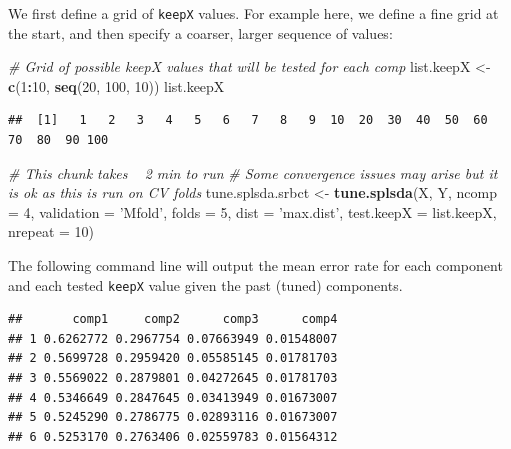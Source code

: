 \documentclass[]{book}
\newenvironment{Shaded}{\begin{snugshade}}{\end{snugshade}}
\newcommand{\KeywordTok}[1]{\textcolor[rgb]{0.13,0.29,0.53}{\textbf{#1}}}
\newcommand{\DataTypeTok}[1]{\textcolor[rgb]{0.13,0.29,0.53}{#1}}
\newcommand{\DecValTok}[1]{\textcolor[rgb]{0.00,0.00,0.81}{#1}}
\newcommand{\StringTok}[1]{\textcolor[rgb]{0.31,0.60,0.02}{#1}}
\newcommand{\CommentTok}[1]{\textcolor[rgb]{0.56,0.35,0.01}{\textit{#1}}}
\newcommand{\OperatorTok}[1]{\textcolor[rgb]{0.81,0.36,0.00}{\textbf{#1}}}
\newcommand{\NormalTok}[1]{#1}
\begin{document}
We first define a grid of \texttt{keepX} values. For example here, we
define a fine grid at the start, and then specify a coarser, larger
sequence of values:

\begin{Shaded}
\begin{Highlighting}[]
\CommentTok{# Grid of possible keepX values that will be tested for each comp}
\NormalTok{list.keepX <-}\StringTok{ }\KeywordTok{c}\NormalTok{(}\DecValTok{1}\OperatorTok{:}\DecValTok{10}\NormalTok{,  }\KeywordTok{seq}\NormalTok{(}\DecValTok{20}\NormalTok{, }\DecValTok{100}\NormalTok{, }\DecValTok{10}\NormalTok{))}
\NormalTok{list.keepX}
\end{Highlighting}
\end{Shaded}

\begin{verbatim}
##  [1]   1   2   3   4   5   6   7   8   9  10  20  30  40  50  60  70  80  90 100
\end{verbatim}

\begin{Shaded}
\begin{Highlighting}[]
\CommentTok{# This chunk takes ~ 2 min to run}
\CommentTok{# Some convergence issues may arise but it is ok as this is run on CV folds}
\NormalTok{tune.splsda.srbct <-}\StringTok{ }\KeywordTok{tune.splsda}\NormalTok{(X, Y, }\DataTypeTok{ncomp =} \DecValTok{4}\NormalTok{, }\DataTypeTok{validation =} \StringTok{'Mfold'}\NormalTok{, }
                                 \DataTypeTok{folds =} \DecValTok{5}\NormalTok{, }\DataTypeTok{dist =} \StringTok{'max.dist'}\NormalTok{, }
                                 \DataTypeTok{test.keepX =}\NormalTok{ list.keepX, }\DataTypeTok{nrepeat =} \DecValTok{10}\NormalTok{)}
\end{Highlighting}
\end{Shaded}

The following command line will output the mean error rate for each
component and each tested \texttt{keepX} value given the past (tuned)
components.

\begin{Shaded}
\end{Shaded}

\begin{verbatim}
##       comp1     comp2      comp3      comp4
## 1 0.6262772 0.2967754 0.07663949 0.01548007
## 2 0.5699728 0.2959420 0.05585145 0.01781703
## 3 0.5569022 0.2879801 0.04272645 0.01781703
## 4 0.5346649 0.2847645 0.03413949 0.01673007
## 5 0.5245290 0.2786775 0.02893116 0.01673007
## 6 0.5253170 0.2763406 0.02559783 0.01564312
\end{verbatim}
\end{document}
